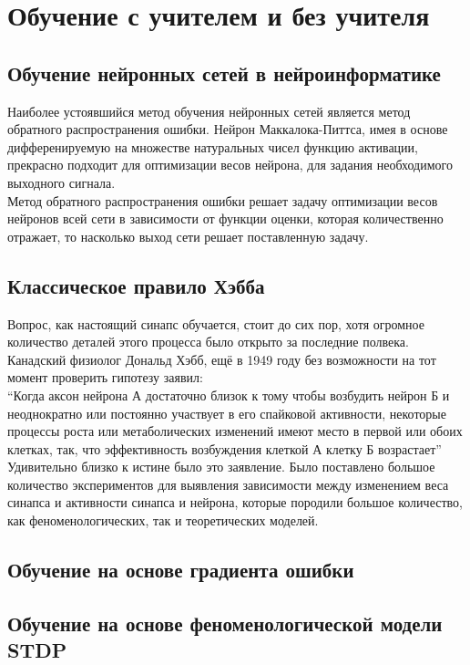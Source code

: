 \documentclass[a4paper,10pt]{article}
\begin{document}
\section{Обучение с учителем и без учителя}
\subsection{Обучение нейронных сетей в нейроинформатике}
\indent Наиболее устоявшийся метод обучения нейронных сетей является метод обратного распространения ошибки. Нейрон Маккалока-Питтса, имея в основе дифференируемую на множестве натуральных чисел функцию активации, прекрасно подходит для оптимизации весов нейрона, для задания необходимого выходного сигнала.\\  
\indent Метод обратного распространения ошибки решает задачу оптимизации весов нейронов всей сети в зависимости от функции оценки, которая количественно отражает, то насколько выход сети решает поставленную задачу. \\
\subsection{Классическое правило Хэбба}
\indent Вопрос, как настоящий синапс обучается, стоит до сих пор, хотя огромное количество деталей этого процесса было открыто за последние полвека. Канадский физиолог Дональд Хэбб, ещё в 1949 году без возможности на тот момент проверить гипотезу заявил:\\
\indent ``Когда аксон нейрона А достаточно близок к тому чтобы возбудить нейрон Б и неоднократно или постоянно участвует в его спайковой активности, некоторые процессы роста или метаболических изменений имеют место в первой или обоих клетках, так, что эффективность возбуждения клеткой А клетку Б возрастает''\cite{Hebb1949}\\
\indent Удивительно близко к истине было это заявление. Было поставлено большое количество экспериментов для выявления зависимости между изменением веса синапса и активности синапса и нейрона, которые породили большое количество, как феноменологических, так и теоретических моделей.
\subsection{Обучение на основе градиента ошибки}
\subsection{Обучение на основе феноменологической модели STDP}
\end{document}
